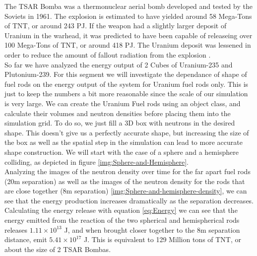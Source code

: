 \documentclass[letterpaper, 12pt]{article}
\begin{document}
         The TSAR Bomba was a thermonuclear aerial bomb developed and tested by the Soviets in 1961. The explosion is estimated to have yielded around 58 Mega-Tons of TNT, or around 243 PJ. If the weapon had a slightly larger deposit of Uranium in the warhead, it was predicted to have been capable of releaseing over 100 Mega-Tons of TNT, or around 418 PJ. The Uranium deposit was lessened in order to reduce the amount of fallout radiation from the explosion \cite{TSAR-BOMBA}.\\

         So far we have analyzed the energy output of 2 Cubes of Uranium-235 and Plutonium-239. For this segment we will investigate the dependance of shape of fuel rods on the energy output of the system for Uranium fuel rods only. This is just to keep the numbers a bit more reasonable since the scale of our simulation is very large. We can create the Uranium Fuel rods using an object class, and calculate their volumes and neutron densities before placing them into the simulation grid. To do so, we just fill a 3D box with neutrons in the desired shape. This doesn't give us a perfectly accurate shape, but increasing the size of the box as well as the spatial step in the simulation can lead to more accurate shape construction. We will start with the case of a sphere and a hemisphere colliding, as depicted in figure \ref{img:Sphere-and-Hemisphere}.\\

         Analyzing the images of the neutron density over time for the far apart fuel rods (20m separation) as well as the images of the neutron density for the rods that are close together (8m separation) \ref{img:Sphere-and-hemisphere-density}, we can see that the energy production increases dramatically as the separation decreases. Calculating the energy release with equation \eqref{eq:Energy} we can see that the energy emitted from the reaction of the two spherical and hemispherical rods releases $1.11 \times 10^{13}$ J, and when brought closer together to the 8m separation distance, emit $5.41 \times 10^{17}$ J. This is equivalent to 129 Million tons of TNT, or about the size of 2 TSAR Bombas. 
\end{document}

